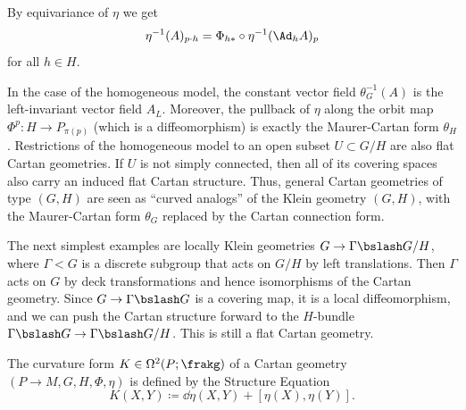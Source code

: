 By equivariance of $\eta$ we get 
\[\eta^{-1}(A)_{p\cdot h}=\Phi_{h\ast}\circ \eta^{-1}(\Ad_h A)_p\]
for all $h\in H$. 


\begin{example}
    In the case of the homogeneous model, the constant vector field $\theta_G^{-1}(A)$ is the left-invariant vector field $A_L$. Moreover, the pullback of $\eta$ along the orbit map $\Phi^p:H\to P_{\pi(p)}$ (which is a diffeomorphism) is exactly the Maurer-Cartan form $\theta_H$. Restrictions of the homogeneous model to an open subset $U\subset G\slash H$ are also flat Cartan geometries. If $U$ is not simply connected, then all of its covering spaces also carry an induced flat Cartan structure.
     Thus, general Cartan geometries of type $(G,H)$ are seen as ``curved analogs'' of the Klein geometry $(G,H)$, with the Maurer-Cartan form $\theta_G$ replaced by the Cartan connection form.
\end{example}

\begin{example}
    The next simplest examples are locally Klein geometries $G\to \Gamma\bslash G\slash H$, where $\Gamma<G$ is a discrete subgroup that acts on $G\slash H$ by left translations. Then $\Gamma$ acts on $G$ by deck transformations and hence isomorphisms of the Cartan geometry. Since $G\to \Gamma\bslash G$ is a covering map, it is a local diffeomorphism, and we can push the Cartan structure forward to the $H$-bundle $\Gamma\bslash G \to \Gamma\bslash G\slash H$. This is still a flat Cartan geometry.
\end{example}


\begin{defn}
    The curvature form $K\in\Omega^2(P;\frakg)$ of a Cartan geometry $(P\to M,G,H,\Phi,\eta)$ is defined by the Structure Equation 
    \[K(X,Y)\coloneqq \dd\eta(X,Y)+[\eta(X),\eta(Y)].\]
\end{defn}


